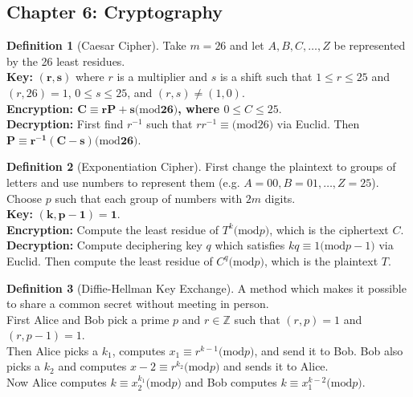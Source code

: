 \documentclass{article}
\newcommand{\Z}{\ensuremath{\mathbb{Z}}}
\renewcommand{\mod}[1]{\ensuremath{(\mathrm{mod}#1})}
\theoremstyle{definition}
\newtheorem*{defn}{Definition}
\theoremstyle{remark}
\begin{document}
    \subsection*{Chapter 6: Cryptography}{
        \begin{defn}[Caesar Cipher]
            Take $m=26$ and let $A,B,C,\ldots,Z$ be represented by the 26 least residues.\\ \textbf{Key:} $\mathbf{(r,s)}$ where $r$ is a multiplier and $s$ is a shift such that $1\leq r \leq 25$ and $(r,26)=1$, $0\leq s\leq 25$, and $(r,s)\neq (1,0)$.\\ \textbf{Encryption: $\mathbf{C \equiv rP+s \mod{26}}$, where $0 \leq C \leq 25$}.\\
            \textbf{Decryption:} First find $r^{-1}$ such that $rr^{-1}\equiv \mod{26}$ via Euclid. Then $\mathbf{P\equiv r^{-1}(C-s)\mod{26}}$.
        \end{defn}
        
        \begin{defn}[Exponentiation Cipher]
            First change the plaintext to groups of letters and use numbers to represent them (e.g. $A=00, B=01,\ldots,Z=25$). Choose $p$ such that each group of numbers with $2m$ digits.\\
            \textbf{Key:} $\mathbf{(k,p-1)=1}$.\\
            \textbf{Encryption:} Compute the least residue of $T^k\mod{p}$, which is the ciphertext $C$.\\
            \textbf{Decryption:} Compute deciphering key $q$ which satisfies $kq\equiv 1\mod{p-1}$ via Euclid. Then compute the least residue of $C^q\mod{p}$, which is the plaintext $T$.
        \end{defn}
        
        \begin{defn}[Diffie-Hellman Key Exchange]
            A method which makes it possible to share a common secret without meeting in person.\\
            First Alice and Bob pick a prime $p$ and $r\in \Z$ such that $(r,p)=1$ and $(r,p-1)=1$.\\
            Then Alice picks a $k_1$, computes $x_1\equiv r^{k-1}\mod{p}$, and send it to Bob. Bob also picks a $k_2$ and computes $x-2\equiv r^{k_2} \mod{p}$ and sends it to Alice.\\
            Now Alice computes $k\equiv x_2^{k_1}\mod p$ and Bob computes $k\equiv x_1^{k-2}\mod{p}$.
        \end{defn}
        
}
\end{document}
